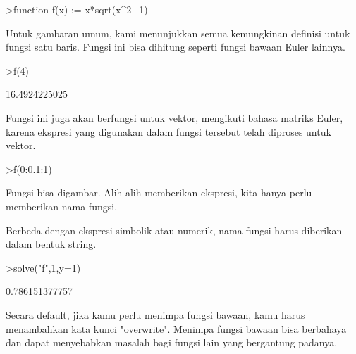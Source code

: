 \documentclass[a4paper,10pt]{article}
\begin{document}
\begin{eulernotebook}
\begin{eulercomment}
\begin{eulercomment}
\begin{eulercomment}
\begin{eulercomment}
\begin{eulercomment}
\begin{eulercomment}
\begin{eulercomment}
\begin{eulercomment}
\begin{eulercomment}
\begin{eulercomment}
\begin{eulerprompt}
>function f(x) := x*sqrt(x^2+1)
\end{eulerprompt}
\begin{eulercomment}
Untuk gambaran umum, kami menunjukkan semua kemungkinan definisi untuk
fungsi satu baris. Fungsi ini bisa dihitung seperti fungsi bawaan
Euler lainnya.
\end{eulercomment}
\begin{eulerprompt}
>f(4)
\end{eulerprompt}
\begin{euleroutput}
  16.4924225025
\end{euleroutput}
\begin{eulercomment}
Fungsi ini juga akan berfungsi untuk vektor, mengikuti bahasa matriks
Euler, karena ekspresi yang digunakan dalam fungsi tersebut telah
diproses untuk vektor.
\end{eulercomment}
\begin{eulerprompt}
>f(0:0.1:1)
\end{eulerprompt}
\begin{euleroutput}
  [0,  0.100499,  0.203961,  0.313209,  0.430813,  0.559017,  0.699714,
  0.854459,  1.0245,  1.21083,  1.41421]
\end{euleroutput}
\begin{eulercomment}
Fungsi bisa digambar. Alih-alih memberikan ekspresi, kita hanya perlu
memberikan nama fungsi.

Berbeda dengan ekspresi simbolik atau numerik, nama fungsi harus
diberikan dalam bentuk string.
\end{eulercomment}
\begin{eulerprompt}
>solve("f",1,y=1)
\end{eulerprompt}
\begin{euleroutput}
  0.786151377757
\end{euleroutput}
\begin{eulercomment}
Secara default, jika kamu perlu menimpa fungsi bawaan, kamu harus
menambahkan kata kunci "overwrite". Menimpa fungsi bawaan bisa
berbahaya dan dapat menyebabkan masalah bagi fungsi lain yang
bergantung padanya.


\end{eulercomment}
\end{eulercomment}
\end{eulercomment}
\end{eulercomment}
\end{eulercomment}
\end{eulercomment}
\end{eulercomment}
\end{eulercomment}
\end{eulercomment}
\end{eulercomment}
\end{eulercomment}
\end{eulernotebook}
\end{document}
